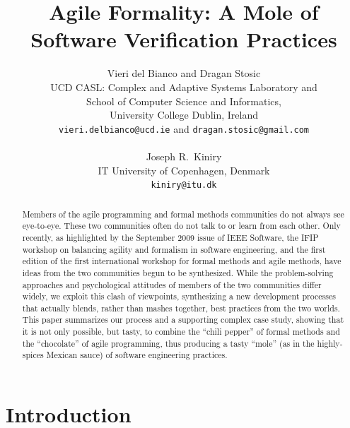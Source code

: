 \documentclass[english]{lni}
\begin{document}
\title{Agile Formality: A Mole of Software Verification Practices}

\author{Vieri del Bianco and Dragan Stosic\\
  UCD CASL: Complex and Adaptive Systems Laboratory and\\
  School of Computer Science and Informatics,\\
  University College Dublin, Ireland\\
  \texttt{vieri.delbianco@ucd.ie} and \texttt{dragan.stosic@gmail.com}\\
  \\
  Joseph R.~Kiniry \\
  IT University of Copenhagen, Denmark\\
  \texttt{kiniry@itu.dk}
}

\maketitle

\begin{abstract}

  Members of the agile programming and formal methods communities do
  not always see eye-to-eye.  These two communities often do not talk
  to or learn from each other.  Only recently, as highlighted by the
  September 2009 issue of IEEE Software, the IFIP workshop on
  balancing agility and formalism in software engineering, and the
  first edition of the first international workshop for formal methods
  and agile methods, have ideas from the two communities begun to be
  synthesized.  While the problem-solving approaches and psychological
  attitudes of members of the two communities differ widely, we
  exploit this clash of viewpoints, synthesizing a new development
  processes that actually blends, rather than mashes together, best
  practices from the two worlds.  This paper summarizes our process
  and a supporting complex case study, showing that it is not only
  possible, but tasty, to combine the ``chili pepper'' of formal
  methods and the ``chocolate'' of agile programming, thus producing a
  tasty ``mole'' (as in the highly-spices Mexican sauce) of software
  engineering practices.

\end{abstract}

\section{Introduction}
\label{sec:introduction}
\end{document}
